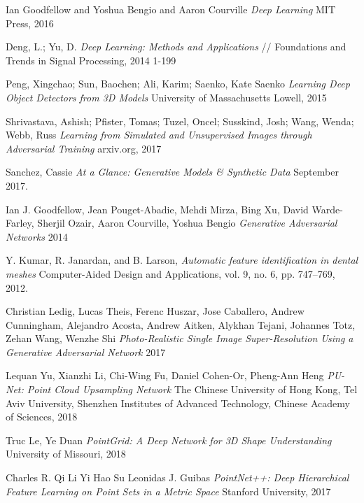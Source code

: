 \begin{thebibliography}{00}



 Ian Goodfellow and Yoshua Bengio and Aaron Courville
\emph{Deep Learning} MIT Press, 2016


 Deng, L.; Yu, D. 
\emph{Deep Learning: Methods and Applications}
// Foundations and Trends in Signal Processing, 2014 1-199

 Peng, Xingchao; Sun, Baochen; Ali, Karim; Saenko, Kate Saenko
\emph{Learning Deep Object Detectors from 3D Models} University of Massachusetts Lowell, 2015

 Shrivastava, Ashish; Pfister, Tomas; Tuzel, Oncel; Susskind, Josh; Wang, Wenda; Webb, Russ 
\emph{Learning from Simulated and Unsupervised Images through Adversarial Training} arxiv.org, 2017

 Sanchez, Cassie
\emph{At a Glance: Generative Models \& Synthetic Data} September 2017.

 Ian J. Goodfellow, Jean Pouget-Abadie, Mehdi Mirza, Bing Xu, David Warde-Farley, Sherjil Ozair, Aaron Courville, Yoshua Bengio
\emph{Generative Adversarial Networks} 2014

 Y. Kumar, R. Janardan, and B. Larson, 
\emph{Automatic feature identification in dental meshes} Computer-Aided Design and Applications, vol. 9, no. 6, pp. 747–769, 2012.

 Christian Ledig, Lucas Theis, Ferenc Huszar, Jose Caballero, Andrew Cunningham, Alejandro Acosta, Andrew Aitken, Alykhan Tejani, Johannes Totz, Zehan Wang, Wenzhe Shi
\emph{Photo-Realistic Single Image Super-Resolution Using a Generative Adversarial Network} 2017

 Lequan Yu, Xianzhi Li, Chi-Wing Fu, Daniel Cohen-Or, Pheng-Ann Heng
\emph{PU-Net: Point Cloud Upsampling Network} The Chinese University of Hong Kong, Tel Aviv University, Shenzhen Institutes of Advanced Technology, Chinese Academy of Sciences, 2018

 Truc Le, Ye Duan
\emph{PointGrid: A Deep Network for 3D Shape Understanding} University of Missouri, 2018

 Charles R. Qi Li Yi Hao Su Leonidas J. Guibas
\emph{PointNet++: Deep Hierarchical Feature Learning on Point Sets in a Metric Space} Stanford University, 2017


\end{thebibliography}
